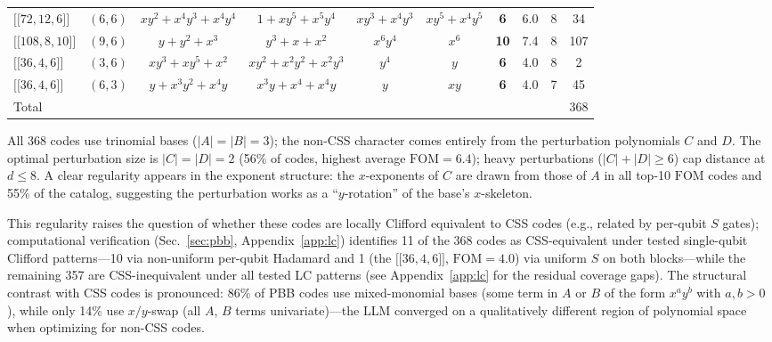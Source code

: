 \documentclass[aps,prxquantum,twocolumn,superscriptaddress,nofootinbib]{revtex4-2}
\newcommand{\dblbrk}[1]{\ensuremath{\lbrack\!\lbrack #1 \rbrack\!\rbrack}}
\newcommand{\code}[1]{\dblbrk{#1}}
\newcommand{\FOM}{\ensuremath{\mathrm{FOM}}}
\begin{document}
\begin{table}[t]
\begin{tabular}{lccccccccc}
$\code{72,12,6}$ & $(6,6)$ & $xy^2{+}x^4 y^3{+}x^4 y^4$ & $1{+}xy^5{+}x^5 y^4$ & $xy^3{+}x^4 y^3$ & $xy^5{+}x^4 y^5$ & \textbf{6} & 6.0 & 8 & 34 \\
$\code{108,8,10}$ & $(9,6)$ & $y{+}y^2{+}x^3$ & $y^3{+}x{+}x^2$ & $x^6 y^4$ & $x^6$ & \textbf{10} & 7.4 & 8 & 107 \\
$\code{36,4,6}$ & $(3,6)$ & $xy^3{+}xy^5{+}x^2$ & $xy^2{+}x^2 y^2{+}x^2 y^3$ & $y^4$ & $y$ & \textbf{6} & 4.0 & 8 & 2 \\
$\code{36,4,6}$ & $(6,3)$ & $y{+}x^3 y^2{+}x^4 y$ & $x^3 y{+}x^4{+}x^4 y$ & $y$ & $xy$ & \textbf{6} & 4.0 & 7 & 45 \\
\midrule
\multicolumn{9}{l}{Total} & 368 \\
\bottomrule
\end{tabular}
\end{table}

All 368 codes use trinomial bases ($|A| = |B| = 3$); the non-CSS character comes entirely from the perturbation polynomials $C$ and $D$.
The optimal perturbation size is $|C| = |D| = 2$ (56\% of codes, highest average $\FOM = 6.4$); heavy perturbations ($|C| + |D| \geq 6$) cap distance at $d \leq 8$.
A clear regularity appears in the exponent structure: the $x$-exponents of $C$ are drawn from those of $A$ in all top-10 $\FOM$ codes and 55\% of the catalog, suggesting the perturbation works as a ``$y$-rotation'' of the base's $x$-skeleton.

This regularity raises the question of whether these codes are locally Clifford equivalent to CSS codes (e.g., related by per-qubit $S$ gates); computational verification (Sec.~\ref{sec:pbb}, Appendix~\ref{app:lc}) identifies 11 of the 368 codes as CSS-equivalent under tested single-qubit Clifford patterns---10 via non-uniform per-qubit Hadamard and 1 (the $\code{36,4,6}$, $\FOM = 4.0$) via uniform $S$ on both blocks---while the remaining 357 are CSS-inequivalent under all tested LC patterns (see Appendix~\ref{app:lc} for the residual coverage gaps).
The structural contrast with CSS codes is pronounced: 86\% of PBB codes use mixed-monomial bases (some term in $A$ or $B$ of the form $x^a y^b$ with $a,b > 0$), while only 14\% use $x/y$-swap (all $A$, $B$ terms univariate)---the LLM converged on a qualitatively different region of polynomial space when optimizing for non-CSS codes.
\end{document}
